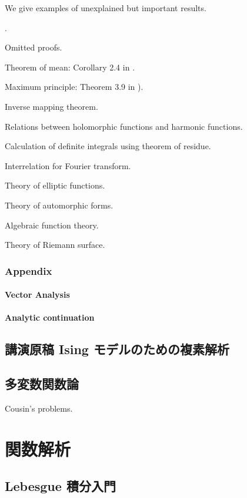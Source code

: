 \documentclass[openany, a4paper, oneside]{book}
\newcounter{enum2}
\renewenvironment{enumerate}{%
\begin{list}%
{%
\arabic{enum2}.\ \,%
}%
{%
\usecounter{enum2}
\setlength{\itemindent}{0pt}%
\setlength{\leftmargin}{6pt}%
\setlength{\rightmargin}{0pt}%
\setlength{\labelsep}{0pt}%
\setlength{\labelwidth}{6pt}%
\setlength{\itemsep}{0pt}%
\setlength{\parsep}{0pt}%
\setlength{\listparindent}{0pt}%
}
}{%
\end{list}%
}
\theoremstyle{break}
\theoremstyle{breakdefn}
\begin{document}
We give examples of unexplained but important results.
\begin{enumerate}
\item Omitted proofs.
\item Theorem of mean: Corollary 2.4 in \cite{MitsuoSugiura2}.
\item Maximum principle: Theorem 3.9 in \cite{MitsuoSugiura2}).
\item Inverse mapping theorem.
\item Relations between holomorphic functions and harmonic functions.
\item Calculation of definite integrals using theorem of residue.
\item Interrelation for Fourier transform.
\item Theory of elliptic functions.
\item Theory of automorphic forms.
\item Algebraic function theory.
\item Theory of Riemann surface.
\end{enumerate}
\section{Appendix}
\label{sec-6-1-13}
\subsection{Vector Analysis}
\label{sec-6-1-13-1}
\subsection{Analytic continuation}
\label{sec-6-1-13-2}
\chapter{講演原稿 Ising モデルのための複素解析}
\label{sec-6-2}
\chapter{多変数関数論}
\label{sec-6-3}

Cousin's problems.
\part{関数解析}
\label{sec-7}
\chapter{Lebesgue 積分入門}
\label{sec-7-1}
\end{document}
